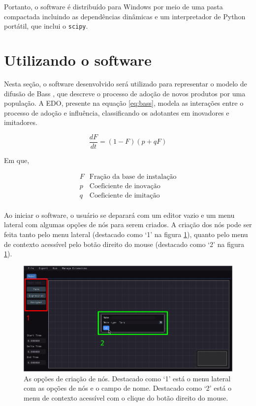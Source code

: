\documentclass[
	12pt,				%
	openright,			%
	oneside,			%
	a4paper,			%
	main=brazil,
	english,			%
	]{ufsj-abntex2}
\begin{document}
Portanto, o software é distribuído para Windows por meio de uma pasta compactada incluindo as dependências dinâmicas e um interpretador de Python portátil, que inclui o \texttt{scipy}.

\section{Utilizando o software}

Nesta seção, o software desenvolvido será utilizado para representar o modelo de difusão de Bass \cite{Bass1969}, que descreve o processo de adoção de novos produtos por uma população. A EDO, presente na equação \ref{eq:bass}, modela as interações entre o processo de adoção e influência, classificando os adotantes em inovadores e imitadores.

\begin{equation}\label{eq:bass}
    \frac{dF}{dt} = (1 - F)(p + qF)
\end{equation}

Em que,

\[
    \begin{array}{lr}
    F & \text{Fração da base de instalação}\\
    p & \text{Coeficiente de inovação}\\
    q & \text{Coeficiente de imitação}\\
    \end{array}
\]

Ao iniciar o software, o usuário se deparará com um editor vazio e um menu lateral com algumas opções de nós para serem criados. A criação dos nós pode ser feita tanto pelo menu lateral (destacado como `1' na figura \ref{fig:criando-nos}), quanto pelo menu de contexto acessível pelo botão direito do mouse (destacado como `2' na figura \ref{fig:criando-nos}).

\begin{figure}[h]
    \centering
    \includegraphics[width=\textwidth]{imgs/ode-designer/passo-a-passo/criando-nos.png} 
    \caption{As opções de criação de nós. Destacado como `1' está o menu lateral com as opções de nós e o campo de nome. Destacado como `2' está o menu de contexto acessível com o clique do botão direito do mouse.}
    \label{fig:criando-nos}
\end{figure}
\end{document}
